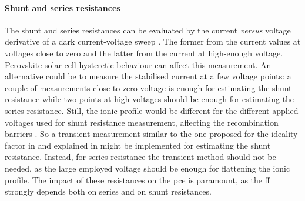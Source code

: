 	\paragraph{Shunt and series resistances} \label{resistances}
	The shunt and series resistances can be evaluated by the current \textsl{versus} voltage derivative of a dark current-voltage sweep \cite{Pysch2007}.
	The former from the current values at voltages close to zero and the latter from the current at high-enough voltage.
	Perovskite solar cell hysteretic behaviour can affect this measurement.
	An alternative could be to measure the stabilised current at a few voltage points: a couple of measurements close to zero voltage is enough for estimating the shunt resistance while two points at high voltages should be enough for estimating the series resistance.
	Still, the ionic profile would be different for the different applied voltages used for shunt resistance measurement, affecting the recombination barriers \cite{Moia2019,Pockett2017}.
	So a transient measurement similar to the one proposed for the ideality factor in \cite{Calado2019} and explained in  might be implemented for estimating the shunt resistance.
	Instead, for series resistance the transient method should not be needed, as the large employed voltage should be enough for flattening the ionic profile.
	The impact of these resistances on the \gls{pce} is paramount, as the \gls{ff} strongly depends both on series and on shunt resistances.

